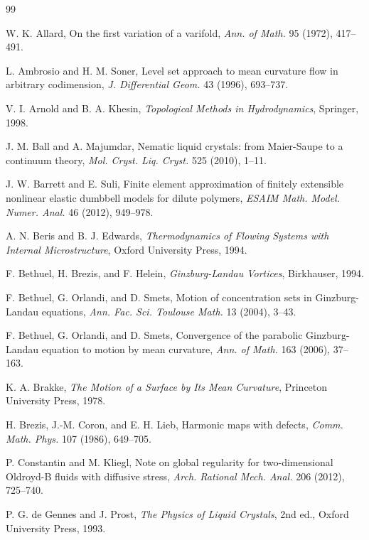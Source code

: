 \documentclass[11pt]{article}
\theoremstyle{definition}
\begin{document}
\begin{thebibliography}{99}

W. K. Allard,
On the first variation of a varifold,
\emph{Ann. of Math.} 95 (1972), 417--491.

L. Ambrosio and H. M. Soner,
Level set approach to mean curvature flow in arbitrary codimension,
\emph{J. Differential Geom.} 43 (1996), 693--737.

V. I. Arnold and B. A. Khesin,
\emph{Topological Methods in Hydrodynamics},
Springer, 1998.

J. M. Ball and A. Majumdar,
Nematic liquid crystals: from Maier-Saupe to a continuum theory,
\emph{Mol. Cryst. Liq. Cryst.} 525 (2010), 1--11.

J. W. Barrett and E. Suli,
Finite element approximation of finitely extensible nonlinear elastic dumbbell
models for dilute polymers,
\emph{ESAIM Math. Model. Numer. Anal.} 46 (2012), 949--978.

A. N. Beris and B. J. Edwards,
\emph{Thermodynamics of Flowing Systems with Internal Microstructure},
Oxford University Press, 1994.

F. Bethuel, H. Brezis, and F. Helein,
\emph{Ginzburg-Landau Vortices},
Birkhauser, 1994.

F. Bethuel, G. Orlandi, and D. Smets,
Motion of concentration sets in Ginzburg-Landau equations,
\emph{Ann. Fac. Sci. Toulouse Math.} 13 (2004), 3--43.

F. Bethuel, G. Orlandi, and D. Smets,
Convergence of the parabolic Ginzburg-Landau equation to motion by mean
curvature,
\emph{Ann. of Math.} 163 (2006), 37--163.

K. A. Brakke,
\emph{The Motion of a Surface by Its Mean Curvature},
Princeton University Press, 1978.

H. Brezis, J.-M. Coron, and E. H. Lieb,
Harmonic maps with defects,
\emph{Comm. Math. Phys.} 107 (1986), 649--705.

P. Constantin and M. Kliegl,
Note on global regularity for two-dimensional Oldroyd-B fluids with diffusive
stress,
\emph{Arch. Rational Mech. Anal.} 206 (2012), 725--740.

P. G. de Gennes and J. Prost,
\emph{The Physics of Liquid Crystals},
2nd ed., Oxford University Press, 1993.


\end{thebibliography}
\end{document}

